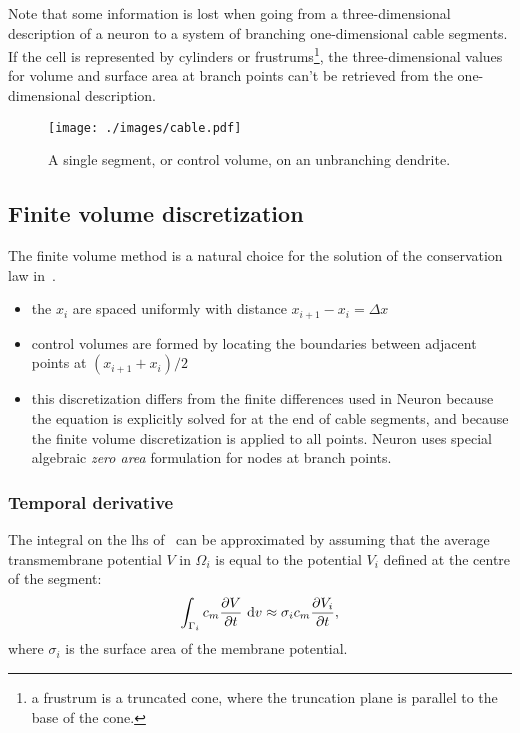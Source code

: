Note that some information is lost when going from a three-dimensional description of a neuron to a system of branching one-dimensional cable segments.
If the cell is represented by cylinders or frustrums\footnote{a frustrum is a truncated cone, where the truncation plane is parallel to the base of the cone.}, the three-dimensional values for volume and surface area at branch points can't be retrieved from the one-dimensional description.

\begin{figure}
    \begin{center}
        \texttt{[image: ./images/cable.pdf]}
    \end{center}
    \caption{A single segment, or control volume, on an unbranching dendrite.}
    \label{fig:segment}
\end{figure}

\subsection{Finite volume discretization}
The finite volume method is a natural choice for the solution of the conservation law in~.

\begin{itemize}
    \item   the $x_i$ are spaced uniformly with distance $x_{i+1}-x_{i} = \Delta x$
    \item   control volumes are formed by locating the boundaries between adjacent points at $(x_{i+1}+x_{i})/2$
    \item   this discretization differs from the finite differences used in Neuron because the equation is explicitly solved for at the end of cable segments, and because the finite volume discretization is applied to all points. Neuron uses special algebraic \emph{zero area} formulation for nodes at branch points.
\end{itemize}

\subsubsection{Temporal derivative}
The integral on the lhs of~ can be approximated by assuming that the average transmembrane potential $V$ in $\Omega_i$ is equal to the potential $V_i$ defined at the centre of the segment:
\begin{equation}
    \int_{\Gamma_i}{c_m \frac{\partial{V}}{\partial{t}} } ~\text{d}{v} \approx \sigma_i c_m \frac{\partial{V_i}}{\partial{t}},
    \label{eq:dvdt}
\end{equation}
where $\sigma_i$ is the surface area of the membrane potential.

